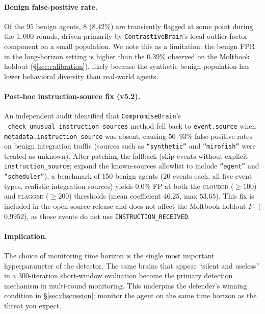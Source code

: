 \documentclass{article}
\begin{document}
\paragraph{Benign false-positive rate.}
Of the $95$ benign agents, $8$ ($8.42\%$) are transiently flagged
at some point during the $1{,}000$ rounds, driven primarily by
\texttt{ContrastiveBrain}'s local-outlier-factor component on a
small population. We note this as a limitation: the benign FPR in
the long-horizon setting is higher than the $0.39\%$ observed on the
Moltbook holdout (\S\ref{sec:calibration}), likely because the
synthetic benign population has lower behavioral diversity than
real-world agents.

\paragraph{Post-hoc instruction-source fix (v5.2).}
An independent audit identified that \texttt{CompromiseBrain}'s
\texttt{\_check\_unusual\_instruction\_sources} method fell back to
\texttt{event.source} when \texttt{metadata.instruction\_source} was
absent, causing $50$--$93\%$ false-positive rates on benign
integration traffic (sources such as \texttt{``synthetic''} and
\texttt{``mirofish''} were treated as unknown). After patching the
fallback (skip events without explicit \texttt{instruction\_source};
expand the known-sources allowlist to include \texttt{``agent''} and
\texttt{``scheduler''}), a benchmark of $150$ benign agents ($20$
events each, all five event types, realistic integration sources)
yields \textbf{$0.0\%$} FP at both the \textsc{clouded} ($\geq 100$)
and \textsc{flagged} ($\geq 200$) thresholds (mean coefficient
$46.25$, max $53.65$). This fix is included in the open-source
release and does not affect the Moltbook holdout $F_1$ ($0.9952$), as
those events do not use \texttt{INSTRUCTION\_RECEIVED}.

\paragraph{Implication.}
The choice of monitoring time horizon is the single most important
hyperparameter of the detector. The same brains that appear ``silent
and useless'' in a $300$-iteration short-window evaluation become
the primary detection mechanism in multi-round monitoring. This
underpins the defender's winning condition in
\S\ref{sec:discussion}: monitor the agent on the same time horizon
as the threat you expect.

\end{document}
